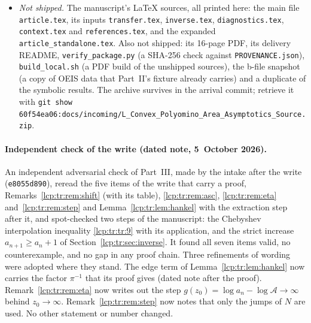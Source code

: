 \documentclass[11pt]{article}
\numberwithin{equation}{section}
\theoremstyle{definition}\newtheorem{definition}[theorem]{Definition}
\theoremstyle{remark}\newtheorem{remark}[theorem]{Remark}
\begin{document}
\begin{itemize}[leftmargin=*,itemsep=0.15em]
 \textsf{[write]} notes are editorial. No statement, proof or number of the
 manuscript was changed.
\item \emph{Not shipped.} The manuscript's \LaTeX{} sources, all printed
 here: the main file \texttt{article.tex}, its inputs
 \texttt{transfer.tex}, \texttt{inverse.tex}, \texttt{diagnostics.tex},
 \texttt{context.tex} and \texttt{references.tex}, and the expanded
 \texttt{article\_\allowbreak standalone.tex}. Also not shipped: its 16-page PDF, its
 delivery README, \texttt{verify\_package.py} (a SHA-256 check against
 \texttt{PROVENANCE.json}), \texttt{build\_local.sh} (a PDF build of the
 unshipped sources), the b-file snapshot (a copy of OEIS data that
 Part~II's fixture already carries) and a duplicate of the symbolic results.
 The archive survives in the arrival commit; retrieve it with
 \texttt{git show 60f54ea06:\allowbreak docs/\allowbreak incoming/\allowbreak L\_Convex\_\allowbreak Polyomino\_\allowbreak Area\_\allowbreak Asymptotics\_\allowbreak Source.zip}.
\end{itemize}

\paragraph{Independent check of the write (dated note, 5~October 2026).}
An independent adversarial check of Part~III, made by the intake after the
write (\texttt{e8055d890}), reread the five items of the write that carry
a proof, Remarks~\ref{lcp:tr:rem:shift} (with its table),
\ref{lcp:tr:rem:asc}, \ref{lcp:tr:rem:eta} and~\ref{lcp:tr:rem:step} and
Lemma~\ref{lcp:tr:lem:hankel} with the extraction step after it, and
spot-checked two steps of the manuscript: the Chebyshev interpolation
inequality \eqref{lcp:tr:tr:9} with its application, and the strict
increase $a_{n+1}\ge a_n+1$ of Section~\ref{lcp:tr:sec:inverse}. It found
all seven items valid, no counterexample, and no gap in any proof chain.
Three refinements of wording were adopted where they stand. The edge term
of Lemma~\ref{lcp:tr:lem:hankel} now carries the factor $\pi^{-1}$ that its
proof gives (dated note after the proof). Remark~\ref{lcp:tr:rem:eta} now
writes out the step $g(z_0)=\log a_n-\log\mathcal A\to\infty$ behind
$z_0\to\infty$. Remark~\ref{lcp:tr:rem:step} now notes that only the jumps
of $N$ are used. No other statement or number changed.
\end{document}
